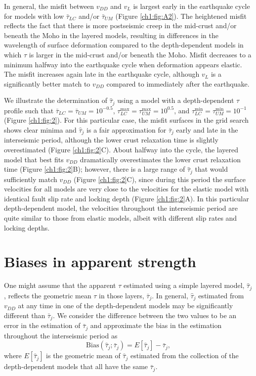 In general, the misfit between $v_{DD}$ and $v_{L}$ is largest early
in the earthquake cycle for models with low $\bar{\tau}_{LC}$ and/or
$\bar{\tau}_{UM}$ (Figure \ref{ch1:fig:A2}). The heightened misfit reflects
the fact that there is more postseismic creep in the mid-crust and/or
beneath the Moho in the layered models, resulting in differences in
the wavelength of surface deformation compared to the depth-dependent
models in which $\tau$ is larger in the mid-crust and/or beneath the
Moho.  Misfit decreases to a minimum halfway into the earthquake cycle
when deformation appears elastic.  The misfit increases again late in
the earthquake cycle, although $v_{L}$ is a significantly better match
to $v_{DD}$ compared to immediately after the earthquake.

We illustrate the determination of $\hat{\tau}_j$ using a model with a
depth-dependent $\tau$ profile such that $\bar{\tau}_{LC} =
\bar{\tau}_{UM} = 10^{-0.5}$, $\tau_{LC}^{\max} = \tau_{UM}^{\max} =
10^{0.5}$, and $\tau_{LC}^{\min} = \tau_{UM}^{\min} = 10^{-1}$ (Figure
\ref{ch1:fig:2}). For this particular case, the misfit surfaces in the
grid search shows clear minima and $\hat{\tau}_j$ is a fair
approximation for $\bar{\tau}_j$ early and late in the interseismic
period, although the lower crust relaxation time is slightly
overestimated (Figure \ref{ch1:fig:2}C). About halfway into the cycle,
the layered model that best fits $v_{DD}$ dramatically overestimates
the lower crust relaxation time (Figure \ref{ch1:fig:2}B); however,
there is a large range of $\hat{\tau}_j$ that would sufficiently match
$v_{DD}$ (Figure \ref{ch1:fig:2}C), since during this period the
surface velocities for all models are very close to the velocities for
the elastic model with identical fault slip rate and locking depth
(Figure \ref{ch1:fig:2}A). In this particular depth-dependent model,
the velocities throughout the interseismic period are quite similar to
those from elastic models, albeit with different slip rates and
locking depths.

\section{Biases in apparent strength}
One might assume that the apparent $\tau$ estimated using a simple
layered model, $\hat{\tau}_j$, reflects the geometric mean $\tau$ in
those layers, $\bar{\tau}_j$. In general, $\hat{\tau}_j$ estimated
from $v_{DD}$ at any time in one of the depth-dependent models may be
significantly different than $\bar{\tau}_j$.  We consider the
difference between the two values to be an error in the estimation of
$\bar{\tau}_j$ and approximate the bias in the estimation throughout
the interseismic period as
\begin{equation}
\mathrm{Bias}(\hat{\tau}_j; \bar{\tau}_j) = E[\hat{\tau}_j] - \bar{\tau}_j,
\label{ch1:eq:bias}
\end{equation}
where $E[\hat{\tau}_j]$ is the geometric mean of $\hat{\tau}_j$
estimated from the collection of the depth-dependent models that all
have the same $\bar{\tau}_j$.

